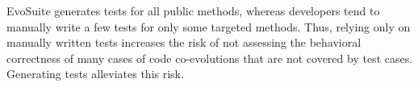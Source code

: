 EvoSuite generates tests for all public methods, whereas developers tend to manually write a few tests for only some targeted methods. Thus, relying only on manually written tests increases the risk of not assessing the behavioral correctness of many cases of code co-evolutions that are not covered by test cases. Generating tests alleviates this risk. 







